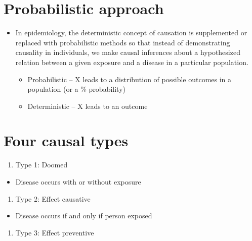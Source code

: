 \documentclass[
]{book}
\providecommand{\tightlist}{%
  \setlength{\itemsep}{0pt}\setlength{\parskip}{0pt}}
\begin{document}
\hypertarget{probabilistic-approach}{%
\section{Probabilistic approach}\label{probabilistic-approach}}

\begin{itemize}
\tightlist
\item
  In epidemiology, the deterministic concept of causation is supplemented or replaced with probabilistic methods so that instead of demonstrating causality in individuals, we make causal inferences about a hypothesized relation between a given exposure and a disease in a particular population.

  \begin{itemize}
  \tightlist
  \item
    Probabilistic -- X leads to a distribution of possible outcomes in a population (or a \% probability)
  \item
    Deterministic -- X leads to an outcome
  \end{itemize}
\end{itemize}

\hypertarget{four-causal-types}{%
\section{Four causal types}\label{four-causal-types}}

\begin{enumerate}
\def\labelenumi{\arabic{enumi}.}
\tightlist
\item
  Type 1: Doomed
\end{enumerate}

\begin{itemize}
\tightlist
\item
  Disease occurs with or without exposure
\end{itemize}

\begin{enumerate}
\def\labelenumi{\arabic{enumi}.}
\setcounter{enumi}{1}
\tightlist
\item
  Type 2: Effect causative
\end{enumerate}

\begin{itemize}
\tightlist
\item
  Disease occurs if and only if person exposed
\end{itemize}

\begin{enumerate}
\def\labelenumi{\arabic{enumi}.}
\setcounter{enumi}{2}
\tightlist
\item
  Type 3: Effect preventive
\end{enumerate}
\end{document}

